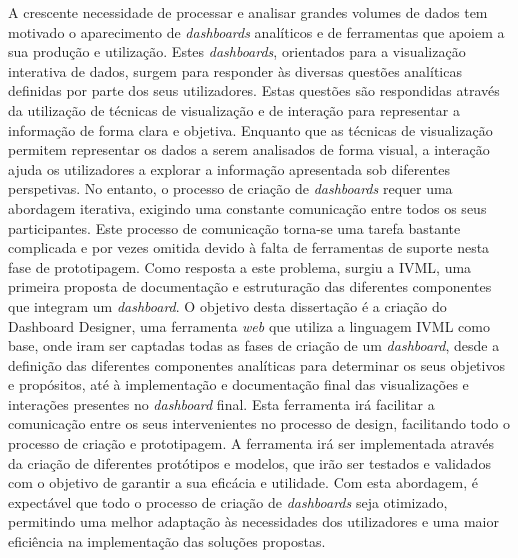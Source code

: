 
%

A crescente necessidade de processar e analisar grandes volumes de dados tem motivado o aparecimento de \textit{dashboards} analíticos e de ferramentas que apoiem a sua produção e utilização. Estes \textit{dashboards}, orientados para a visualização interativa de dados, surgem para responder às diversas questões analíticas definidas por parte dos seus utilizadores. Estas questões são respondidas através da utilização de técnicas de visualização e de interação para representar a informação de forma clara e objetiva. Enquanto que as técnicas de visualização permitem representar os dados a serem analisados de forma visual, a interação ajuda os utilizadores a explorar a informação apresentada sob diferentes perspetivas. No entanto, o processo de criação de \textit{dashboards} requer uma abordagem iterativa, exigindo uma constante comunicação entre todos os seus participantes. Este processo de comunicação torna-se uma tarefa bastante complicada e por vezes omitida devido à falta de ferramentas de suporte nesta fase de prototipagem. Como resposta a este problema, surgiu a \gls{IVML}, uma primeira proposta de documentação e estruturação das diferentes componentes que integram um \textit{dashboard}. O objetivo desta dissertação é a criação do Dashboard Designer, uma ferramenta \textit{web} que utiliza a linguagem \gls{IVML} como base, onde iram ser captadas todas as fases de criação de um \textit{dashboard}, desde a definição das diferentes componentes analíticas para determinar os seus objetivos e propósitos, até à implementação e documentação final das visualizações e interações presentes no \textit{dashboard} final. Esta ferramenta irá facilitar a comunicação entre os seus intervenientes no processo de design, facilitando todo o processo de criação e prototipagem. A ferramenta irá ser implementada através da criação de diferentes protótipos e modelos, que irão ser testados e validados com o objetivo de garantir a sua eficácia e utilidade. Com esta abordagem, é expectável que todo o processo de criação de \textit{dashboards} seja otimizado, permitindo uma melhor adaptação às necessidades dos utilizadores e uma maior eficiência na implementação das soluções propostas.


